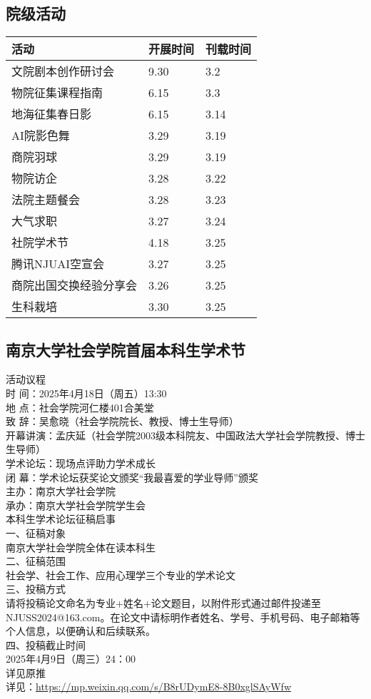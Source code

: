 \documentclass[letterpaper, 12pt]{article}
\begin{document}
\begin{multicols}{2}
\section{院级活动}
\begin{tabular}{|>{\centering\arraybackslash}m{}|m{}|m{}|}
\hline
    活动 & 开展时间 & 刊载时间\\
    \hline\hline
    文院剧本创作研讨会 & 9.30 & 3.2\\
    物院征集课程指南 & 6.15 & 3.3\\
    地海征集春日影 & 6.15 & 3.14\\
    AI院影色舞 & 3.29 & 3.19\\
    商院羽球 & 3.29 & 3.19\\
    物院访企 & 3.28 & 3.22\\
    法院主题餐会 & 3.28 & 3.23\\
    大气求职 & 3.27 & 3.24\\
    社院学术节 & 4.18 & 3.25\\
    腾讯NJUAI空宣会 & 3.27 & 3.25\\
    商院出国交换经验分享会 & 3.26 & 3.25\\
    生科栽培 & 3.30 & 3.25\\
    \hline
\end{tabular}
\subsection{南京大学社会学院首届本科生学术节}
活动议程
\\时 间：2025年4月18日（周五）13:30
\\地 点：社会学院河仁楼401合美堂
\\致 辞：吴愈晓（社会学院院长、教授、博士生导师）
\\开幕讲演：孟庆延（社会学院2003级本科院友、中国政法大学社会学院教授、博士生导师）
\\学术论坛：现场点评助力学术成长 
\\闭 幕：学术论坛获奖论文颁奖“我最喜爱的学业导师”颁奖
\\主办：南京大学社会学院
\\承办：南京大学社会学院学生会
\\本科生学术论坛征稿启事
\\一、征稿对象
\\南京大学社会学院全体在读本科生
\\二、征稿范围
\\社会学、社会工作、应用心理学三个专业的学术论文
\\三、投稿方式
\\请将投稿论文命名为专业+姓名+论文题目，以附件形式通过邮件投递至 NJUSS2024@163.com。在论文中请标明作者姓名、学号、手机号码、电子邮箱等个人信息，以便确认和后续联系。
\\四、投稿截止时间
\\2025年4月9日（周三）24：00
\\详见原推
\\详见：\url{https://mp.weixin.qq.com/s/B8rUDymE8-8B0xglSAyWfw}


\end{multicols}
\end{document}
